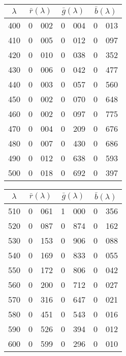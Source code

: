 {
\small
{
\noindent\resizebox{\linewidth}{!}{}\\
\setlength{\tabcolsep}{.35em}
\begin{minipage}{.3\textwidth}
\centering
\begin{tabular}{c|r@{.}l | r@{.}l | r@{.}l}
$\lambda$ & \multicolumn{2}{c|}{$\bar r(\lambda)$} &  \multicolumn{2}{c|}{$\bar g(\lambda)$} &  \multicolumn{2}{c}{$\bar b(\lambda)$} \\
\hline
 400 &   0&002 &   0&004 &   0&013 \\
 410 &   0&005 &   0&012 &   0&097 \\
 420 &   0&010 &   0&038 &   0&352 \\
 430 &   0&006 &   0&042 &   0&477 \\
 440 &   0&003 &   0&057 &   0&560 \\
 450 &   0&002 &   0&070 &   0&648 \\
 460 &   0&002 &   0&097 &   0&775 \\
 470 &   0&004 &   0&209 &   0&676 \\
 480 &   0&007 &   0&430 &   0&686 \\
 490 &   0&012 &   0&638 &   0&593 \\
 500 &   0&018 &   0&692 &   0&397 \\
\end{tabular}
\end{minipage}\hfill
\begin{minipage}{.3\textwidth}
\centering
\begin{tabular}{c|r@{.}l | r@{.}l | r@{.}l}
$\lambda$ & \multicolumn{2}{c|}{$\bar r(\lambda)$} &  \multicolumn{2}{c|}{$\bar g(\lambda)$} &  \multicolumn{2}{c}{$\bar b(\lambda)$} \\
\hline
 510 &   0&061 &   1&000 &   0&356 \\
 520 &   0&087 &   0&874 &   0&162 \\
 530 &   0&153 &   0&906 &   0&088 \\
 540 &   0&169 &   0&833 &   0&055 \\
 550 &   0&172 &   0&806 &   0&042 \\
 560 &   0&200 &   0&712 &   0&027 \\
 570 &   0&316 &   0&647 &   0&021 \\
 580 &   0&451 &   0&543 &   0&016 \\
 590 &   0&526 &   0&394 &   0&012 \\
 600 &   0&599 &   0&296 &   0&010 \\

\end{tabular}
\end{minipage}}}
